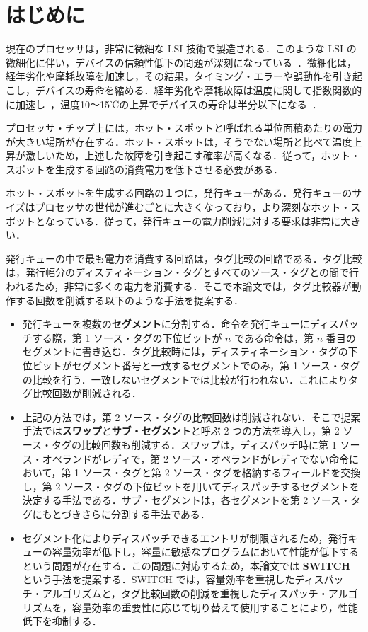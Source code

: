 
\chapter{はじめに}
\label{sec:introduction}
現在のプロセッサは，非常に微細な LSI 技術で製造される．このような LSI の微細化に伴い，デバイスの信頼性低下の問題が深刻になっている~\cite{Weste2010}．微細化は，経年劣化や摩耗故障を加速し，その結果，タイミング・エラーや誤動作を引き起こし，デバイスの寿命を縮める．経年劣化や摩耗故障は温度に関して指数関数的に加速し~\cite{Monsieur2001,Khan2010,Black1969}，温度10〜15℃の上昇でデバイスの寿命は半分以下になる~\cite{Viswanath2000}．

プロセッサ・チップ上には，ホット・スポットと呼ばれる単位面積あたりの電力が大きい場所が存在する．ホット・スポットは，そうでない場所と比べて温度上昇が激しいため，上述した故障を引き起こす確率が高くなる．従って，ホット・スポットを生成する回路の消費電力を低下させる必要がある．

ホット・スポットを生成する回路の１つに，発行キューがある．発行キューのサイズはプロセッサの世代が進むごとに大きくなっており，より深刻なホット・スポットとなっている．従って，発行キューの電力削減に対する要求は非常に大きい．
  
発行キューの中で最も電力を消費する回路は，タグ比較の回路である．タグ比較は，発行幅分のディスティネーション・タグとすべてのソース・タグとの間で行われるため，非常に多くの電力を消費する．そこで本論文では，タグ比較器が動作する回数を削減する以下のような手法を提案する．
\begin{itemize}
  \item 発行キューを複数の\textbf{セグメント}に分割する．命令を発行キューにディスパッチする際，第 1 ソース・タグの下位ビットが $n$ である命令は，第 $n$ 番目のセグメントに書き込む．タグ比較時には，ディスティネーション・タグの下位ビットがセグメント番号と一致するセグメントでのみ，第 1 ソース・タグの比較を行う．一致しないセグメントでは比較が行われない．これによりタグ比較回数が削減される．
  \item 上記の方法では，第 2 ソース・タグの比較回数は削減されない．そこで提案手法では\textbf{スワップ}と\textbf{サブ・セグメント}と呼ぶ 2 つの方法を導入し，第 2 ソース・タグの比較回数も削減する．スワップは，ディスパッチ時に第 1 ソース・オペランドがレディで，第 2 ソース・オペランドがレディでない命令において，第 1 ソース・タグと第 2  ソース・タグを格納するフィールドを交換し，第 2 ソース・タグの下位ビットを用いてディスパッチするセグメントを決定する手法である．サブ・セグメントは，各セグメントを第 2 ソース・タグにもとづきさらに分割する手法である．
  \item セグメント化によりディスパッチできるエントリが制限されるため，発行キューの容量効率が低下し，容量に敏感なプログラムにおいて性能が低下するという問題が存在する．この問題に対応するため，本論文では \textbf{SWITCH} という手法を提案する．SWITCH では，容量効率を重視したディスパッチ・アルゴリズムと，タグ比較回数の削減を重視したディスパッチ・アルゴリズムを，容量効率の重要性に応じて切り替えて使用することにより，性能低下を抑制する．
\end{itemize}

